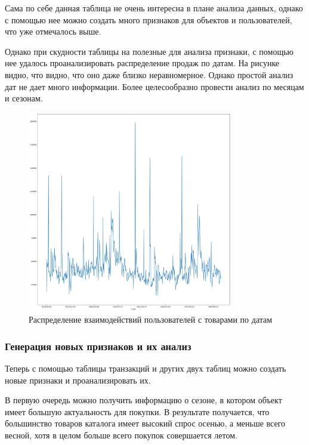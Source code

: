 \documentclass[bachelor, och, coursework]{SCWorks}
\begin{document}
Сама по себе данная таблица не очень интересна в плане анализа данных, однако с помощью нее можно создать много признаков для объектов и пользователей, что уже отмечалось выше.

Однако при скудности таблицы на полезные для анализа признаки, с помощью нее удалось проанализировать распределение продаж по датам. На рисунке видно, что видно, что оно даже
близко неравномерное. Однако простой анализ дат не дает много информации. Более целесообразно провести анализ по месяцам и сезонам.

\begin{figure}[H]
    \centering
    \includegraphics[width=0.8\textwidth]{pic/9}
    \caption{Распределение взаимодействий пользователей с товарами по датам}
    \label{fig:img1}
\end{figure}


\subsubsection{Генерация новых признаков и их анализ}

Теперь с помощью таблицы транзакций и других двух таблиц можно создать новые признаки и проанализировать их. 

В первую очередь можно получить информацию о сезоне, в котором объект имеет большую актуальность для покупки. В результате получается, что большинство товаров каталога имеет высокий спрос осенью, а меньше всего весной, хотя в целом больше всего покупок совершается летом.
\end{document}
